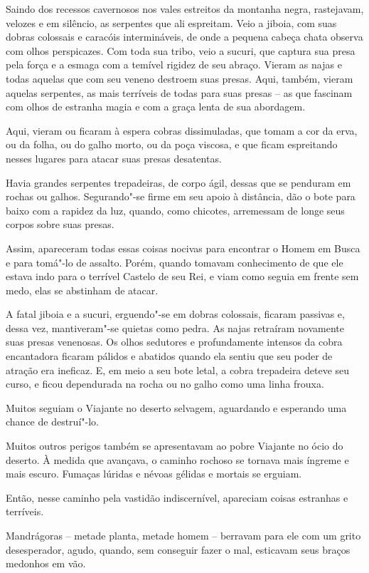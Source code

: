 Saindo dos recessos cavernosos nos vales estreitos da montanha negra,
rastejavam, velozes e em silêncio, as serpentes que ali espreitam. Veio
a jiboia, com suas dobras colossais e caracóis intermináveis, de onde a
pequena cabeça chata observa com olhos perspicazes. Com toda sua
tribo, veio a sucuri, que captura sua presa pela força e a esmaga com a
temível rigidez de seu abraço. Vieram as najas e todas aquelas que com
seu veneno destroem suas presas. Aqui, também, vieram aquelas serpentes,
as mais terríveis de todas para suas presas -- as que fascinam com olhos
de estranha magia e com a graça lenta de sua abordagem.

Aqui, vieram ou ficaram à espera cobras dissimuladas, que tomam a cor da
erva, ou da folha, ou do galho morto, ou da poça viscosa, e que
ficam espreitando nesses lugares para atacar suas presas desatentas.

Havia grandes serpentes trepadeiras, de corpo ágil, dessas que se
penduram em rochas ou galhos. Segurando"-se firme em seu apoio à
distância, dão o bote para baixo com a rapidez da luz, quando,
como chicotes, arremessam de longe seus corpos sobre suas presas.

Assim, apareceram todas essas coisas nocivas para encontrar o Homem
em Busca e para tomá"-lo de assalto. Porém, quando tomavam conhecimento
de que ele estava indo para o terrível Castelo de seu Rei, e viam como
seguia em frente sem medo, elas se abstinham de atacar.

A fatal jiboia e a sucuri, erguendo"-se em dobras colossais, ficaram
passivas e, dessa vez, mantiveram"-se quietas como pedra. As najas
retraíram novamente suas presas venenosas. Os olhos sedutores e
profundamente intensos da cobra encantadora ficaram pálidos e abatidos
quando ela sentiu que seu poder de atração era ineficaz. E, em meio a seu
bote letal, a cobra trepadeira deteve seu curso, e ficou dependurada na
rocha ou no galho como uma linha frouxa.

Muitos seguiam o Viajante no deserto selvagem, aguardando e esperando
uma chance de destruí"-lo.

Muitos outros perigos também se apresentavam ao pobre Viajante no ócio
do deserto. À medida que avançava, o caminho rochoso se tornava mais
íngreme e mais escuro. Fumaças lúridas e névoas gélidas e mortais se
erguiam.

Então, nesse caminho pela vastidão indiscernível, apareciam coisas estranhas
e terríveis.

Mandrágoras -- metade planta, metade homem -- berravam para ele com um
grito desesperador, agudo, quando, sem conseguir fazer o mal, esticavam
seus braços medonhos em vão.

